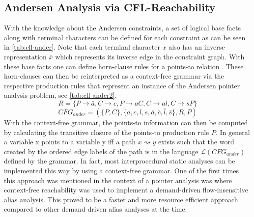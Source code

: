 \subsection{Andersen Analysis via CFL-Reachability}\label{sec:ander-cfl}
With the knowledge about the Andersen constraints, a set of logical base facts along with terminal characters can be defined for each constraint as can be seen in \autoref{tab:cfl-ander}. Note that each terminal character $x$ also has an inverse representation $\bar{x}$ which represents its inverse edge in the constraint graph.
With these base facts one can define horn-clause rules for a points-to relation \cite{reps1998program}. These horn-clauses can then be reinterpreted as a context-free grammar via the respective production rules that represent an instance of the Andersen pointer analysis problem, see \autoref{tab:cfl-ander2}.
$$R=\{P\rightarrow \bar{a}, C \rightarrow c, P\rightarrow aC, C\rightarrow al, C\rightarrow sP\}$$
$$CFG_{ander}=(\{P,C\}, \{a,c,l,s,\bar{a},\bar{c},\bar{l},\bar{s}\}, R, P)$$
With the context-free grammar, the points-to information can then be computed by calculating the transitive closure of the points-to production rule $P$. In general a variable x points to a variable y iff a path $x \rightsquigarrow y$ exists such that the word created by the ordered edge labels of the path is in the language $\mathcal{L}(CFG_{ander})$ defined by the grammar.
In fact, most interprocedural static analyses can be implemented this way by using a context-free grammar.
One of the first times this approach was mentioned in the context of a pointer analysis was \cite{zheng2008demand} where context-free reachability was used to implement a demand-driven flow-insensitive alias analysis.
This proved to be a faster and more resource efficient approach compared to other demand-driven alias analyses at the time.

